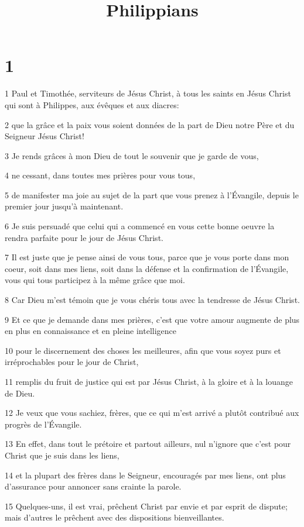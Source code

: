 

\title{Philippians}


\chapter{1}

\par 1 Paul et Timothée, serviteurs de Jésus Christ, à tous les saints en Jésus Christ qui sont à Philippes, aux évêques et aux diacres:
\par 2 que la grâce et la paix vous soient données de la part de Dieu notre Père et du Seigneur Jésus Christ!
\par 3 Je rends grâces à mon Dieu de tout le souvenir que je garde de vous,
\par 4 ne cessant, dans toutes mes prières pour vous tous,
\par 5 de manifester ma joie au sujet de la part que vous prenez à l'Évangile, depuis le premier jour jusqu'à maintenant.
\par 6 Je suis persuadé que celui qui a commencé en vous cette bonne oeuvre la rendra parfaite pour le jour de Jésus Christ.
\par 7 Il est juste que je pense ainsi de vous tous, parce que je vous porte dans mon coeur, soit dans mes liens, soit dans la défense et la confirmation de l'Évangile, vous qui tous participez à la même grâce que moi.
\par 8 Car Dieu m'est témoin que je vous chéris tous avec la tendresse de Jésus Christ.
\par 9 Et ce que je demande dans mes prières, c'est que votre amour augmente de plus en plus en connaissance et en pleine intelligence
\par 10 pour le discernement des choses les meilleures, afin que vous soyez purs et irréprochables pour le jour de Christ,
\par 11 remplis du fruit de justice qui est par Jésus Christ, à la gloire et à la louange de Dieu.
\par 12 Je veux que vous sachiez, frères, que ce qui m'est arrivé a plutôt contribué aux progrès de l'Évangile.
\par 13 En effet, dans tout le prétoire et partout ailleurs, nul n'ignore que c'est pour Christ que je suis dans les liens,
\par 14 et la plupart des frères dans le Seigneur, encouragés par mes liens, ont plus d'assurance pour annoncer sans crainte la parole.
\par 15 Quelques-uns, il est vrai, prêchent Christ par envie et par esprit de dispute; mais d'autres le prêchent avec des dispositions bienveillantes.
